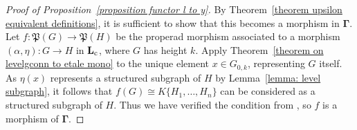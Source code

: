 \documentclass{amsart}
\numberwithin{theorem}{subsection}
\theoremstyle{definition}
\newcommand{\name}[1]{\ensuremath{\text{\textup{#1}}}}
\newcommand{\levelg}{\mathbf{L}}
\newcommand{\levelgconn}{\levelg_{\name{c}}}
\newcommand{\hryGamma}{\mathbf{\Gamma}}
\begin{document}
\begin{proof}[Proof of Proposition~\ref{proposition functor l to y}]
By Theorem~\ref{theorem upsilon equivalent definitions}, it is sufficient to show that this becomes a morphism in $\hryGamma$.
Let $f : \mathfrak{P}(G) \to \mathfrak{P}(H)$ be the properad morphism associated to a morphism $(\alpha, \eta) : G\to H$ in $\levelgconn$, where $G$ has height $k$.
Apply Theorem~\ref{theorem on levelgconn to etale mono} to the unique element $x\in G_{0,k}$, representing $G$ itself.
As $\eta(x)$ represents a structured subgraph of $H$ by Lemma~\ref{lemma: level subgraph}, it follows that $f(G) \cong K\{H_1, \dots, H_n\}$ can be considered as a structured subgraph of $H$.
Thus we have verified the condition from \cite[Definition 6.46]{hrybook}, so $f$ is a morphism of $\hryGamma$.
\end{proof}



\end{document}
